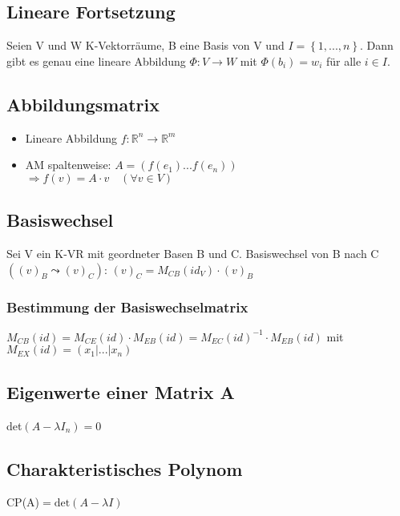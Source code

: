 \documentclass[ngerman,11pt,a4paper
,pdftex]{article}
\newcommand{\f}[1]{$#1$}
\theoremstyle{nodot}
\theoremstyle{nodot}
\begin{document}
\begin{multicols*}{3}
\begin{tcolorbox}[colback=white,bottom=10pt, top=10pt]
          \subsection*{Lineare Fortsetzung}
          Seien V und W K-Vektorräume, B eine Basis von V und \f{I = \left\{1,...,n\right\}}. Dann gibt es genau eine lineare Abbildung \f{\Phi: V\rightarrow W} mit \f{\Phi(b_i)=w_i} für alle \f{i\in I}. 
        \end{tcolorbox}

        \begin{tcolorbox}[colback=white,bottom=10pt, top=10pt]
          \subsection*{Abbildungsmatrix}
          \begin{itemize}
            \item Lineare Abbildung \f{f:\mathbb{R}^n\rightarrow\mathbb{R}^m}
            \item AM spaltenweise: \f{A=(f(e_1)...f(e_n))}\\
            \f{\Rightarrow f(v)=A\cdot v\quad (\forall v \in V)}
          \end{itemize}
          \subsection*{Basiswechsel}
          Sei V ein K-VR mit geordneter Basen B und C. Basiswechsel von B nach C \f{((v)_B\leadsto(v)_C)}:
          \f{(v)_C=M_{CB}(id_V)\cdot(v)_B}
          \subsubsection*{Bestimmung der Basiswechselmatrix}
          \f{M_{CB}(id)=M_{CE}(id)\cdot M_{EB}(id)=M_{EC}(id)^{-1}\cdot M_{EB}(id)} mit \f{M_{EX}(id)=(x_1|...|x_n)}
        \end{tcolorbox}

        \begin{tcolorbox}[colback=white,bottom=10pt, top=10pt]
          \subsection*{Eigenwerte einer Matrix A}
          det\f{(A-\lambda I_n)=0}\\[5pt]
          \subsection*{Charakteristisches Polynom}
          CP(A)\f{=\text{det}(A-\lambda I)}\\[5pt]

\end{tcolorbox}
\end{multicols*}
\end{document}
